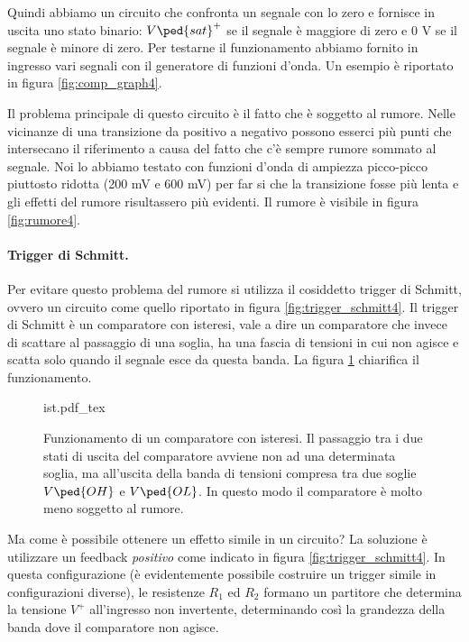 Quindi abbiamo un circuito che confronta un segnale con lo zero e fornisce in uscita uno stato binario:
$V\ped{sat}^+$ se il segnale è maggiore di zero e 0 V se il segnale è minore di zero.
Per testarne il funzionamento abbiamo fornito in ingresso vari segnali con il generatore di funzioni
d'onda. Un esempio è riportato in figura \ref{fig:comp_graph4}.

Il problema principale di questo circuito è il fatto che è soggetto al rumore. Nelle vicinanze di
una transizione da positivo a negativo possono esserci più punti che intersecano il riferimento a causa
del fatto che c'è sempre rumore sommato al segnale. Noi lo abbiamo
testato con funzioni d'onda di ampiezza picco-picco piuttosto ridotta (200 mV e 600 mV) per
far si che la transizione fosse più lenta e gli effetti del rumore risultassero più evidenti.
Il rumore è visibile in figura \ref{fig:rumore4}.

\paragraph{Trigger di Schmitt.}

Per evitare questo problema del rumore si utilizza il cosiddetto trigger di Schmitt, ovvero un circuito
come quello riportato in figura \ref{fig:trigger_schmitt4}. Il trigger di Schmitt è un comparatore con isteresi,
vale a dire un comparatore che invece di scattare al passaggio di una soglia, ha una fascia di tensioni
in cui non agisce e scatta solo quando il segnale esce da questa banda. La figura \ref{fig:comp_ist_exp4} chiarifica
il funzionamento.

\begin{figure}[t]
    \centering
    \small
    \def\svgwidth{\columnwidth}
    {ist.pdf_tex}
	\caption{Funzionamento di un comparatore con isteresi. Il passaggio tra i due stati
        di uscita del comparatore avviene non ad una determinata soglia, ma all'uscita della
        banda di tensioni compresa tra due soglie $V\ped{OH}$ e $V\ped{OL}$. In questo modo il
        comparatore è molto meno soggetto al rumore.}
	\label{fig:comp_ist_exp4}
\end{figure}

Ma come è possibile ottenere un effetto simile in un circuito? La soluzione è utilizzare un feedback \emph{positivo}
come indicato in figura \ref{fig:trigger_schmitt4}. In questa configurazione (è evidentemente possibile costruire un trigger
simile in configurazioni diverse), le resistenze $R_1$ ed $R_2$ formano un partitore che determina
la tensione $V^+$ all'ingresso non invertente, determinando così la grandezza della banda dove il comparatore non agisce.

